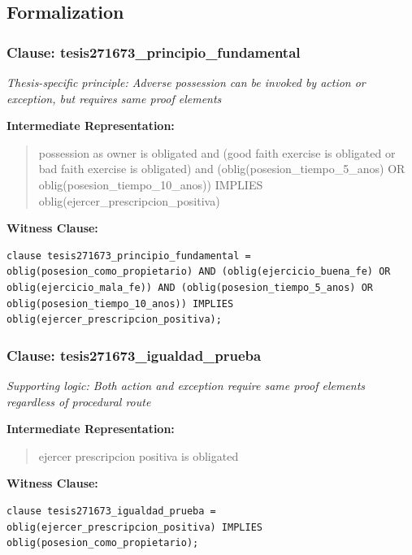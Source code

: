 \documentclass[11pt,a4paper]{article}
\begin{document}
\subsection{Formalization}

\subsubsection{Clause: tesis271673\_principio\_fundamental}

\textit{Thesis-specific principle: Adverse possession can be invoked by action or exception, but requires same proof elements}

\textbf{Intermediate Representation:}

\begin{quote}
possession as owner is obligated and (good faith exercise is obligated or bad faith exercise is obligated) and (oblig(posesion\_tiempo\_5\_anos) OR oblig(posesion\_tiempo\_10\_anos)) IMPLIES oblig(ejercer\_prescripcion\_positiva)
\end{quote}

\textbf{Witness Clause:}

\begin{lstlisting}[style=witnessstyle, language=Witness]
clause tesis271673_principio_fundamental = oblig(posesion_como_propietario) AND (oblig(ejercicio_buena_fe) OR oblig(ejercicio_mala_fe)) AND (oblig(posesion_tiempo_5_anos) OR oblig(posesion_tiempo_10_anos)) IMPLIES oblig(ejercer_prescripcion_positiva);
\end{lstlisting}

\subsubsection{Clause: tesis271673\_igualdad\_prueba}

\textit{Supporting logic: Both action and exception require same proof elements regardless of procedural route}

\textbf{Intermediate Representation:}

\begin{quote}
ejercer prescripcion positiva is obligated
\end{quote}

\textbf{Witness Clause:}

\begin{lstlisting}[style=witnessstyle, language=Witness]
clause tesis271673_igualdad_prueba = oblig(ejercer_prescripcion_positiva) IMPLIES oblig(posesion_como_propietario);
\end{lstlisting}
\end{document}
